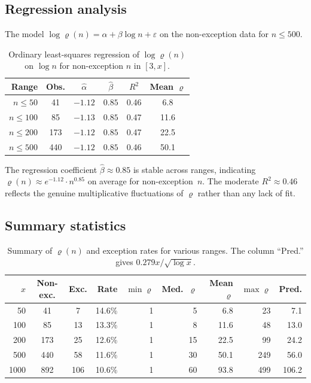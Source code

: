 \documentclass[12pt]{amsart}
\theoremstyle{bluehead}
\theoremstyle{orangehead}
\theoremstyle{greenhead}
\begin{document}
\subsection{Regression analysis}

The model $\log\varrho(n)=\alpha+\beta\log n+\varepsilon$ on the
non-exception data for $n\le500$.

\begin{table}[!ht]
\centering
\caption{Ordinary least-squares regression of $\log\varrho(n)$ on
$\log n$ for non-exception $n$ in $[3,x]$.}
\label{tab:reg}
\small
\begin{tabular}{@{}rccccc@{}}
\toprule
Range & Obs. & $\hat\alpha$ & $\hat\beta$ & $R^2$ & Mean $\varrho$\\
\midrule
$n\le 50$  & 41  & $-1.12$ & $0.85$ & 0.46 & 6.8 \\
$n\le 100$ & 85  & $-1.13$ & $0.85$ & 0.47 & 11.6\\
$n\le 200$ & 173 & $-1.12$ & $0.85$ & 0.47 & 22.5\\
$n\le 500$ & 440 & $-1.12$ & $0.85$ & 0.46 & 50.1\\
\bottomrule
\end{tabular}
\end{table}

The regression coefficient $\hat\beta\approx0.85$ is stable across
ranges, indicating $\varrho(n)\approx e^{-1.12}\cdot n^{0.85}$ on
average for non-exception~$n$.
The moderate $R^2\approx0.46$ reflects the genuine multiplicative
fluctuations of $\varrho$ rather than any lack of fit.

\subsection{Summary statistics}

\begin{table}[!ht]
\centering
\caption{Summary of $\varrho(n)$ and exception rates for various ranges.
The column ``Pred.'' gives $0.279x/\sqrt{\log x}$.}
\label{tab:summary}
\small
\begin{tabular}{@{}rccrrrrrr@{}}
\toprule
$x$ & Non-exc. & Exc. & Rate & $\min\varrho$ & Med.\ $\varrho$
    & Mean $\varrho$ & $\max\varrho$ & Pred.\\
\midrule
  50 &  41 &  7 & 14.6\% & 1 &  5 &  6.8 & 23  &  7.1\\
 100 &  85 & 13 & 13.3\% & 1 &  8 & 11.6 & 48  & 13.0\\
 200 & 173 & 25 & 12.6\% & 1 & 15 & 22.5 & 99  & 24.2\\
 500 & 440 & 58 & 11.6\% & 1 & 30 & 50.1 & 249 & 56.0\\
1000 & 892 &106 & 10.6\% & 1 & 60 & 93.8 & 499 &106.2\\
\bottomrule
\end{tabular}
\end{table}
\end{document}
